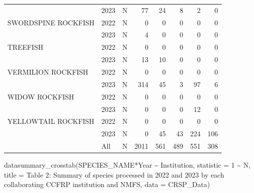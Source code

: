 \documentclass[
  letterpaper,
  DIV=11,
  numbers=noendperiod]{scrartcl}
\newenvironment{Shaded}{\begin{snugshade}}{\end{snugshade}}
\newcommand{\AttributeTok}[1]{\textcolor[rgb]{0.40,0.45,0.13}{#1}}
\newcommand{\DecValTok}[1]{\textcolor[rgb]{0.68,0.00,0.00}{#1}}
\newcommand{\FunctionTok}[1]{\textcolor[rgb]{0.28,0.35,0.67}{#1}}
\newcommand{\NormalTok}[1]{\textcolor[rgb]{0.00,0.23,0.31}{#1}}
\newcommand{\SpecialCharTok}[1]{\textcolor[rgb]{0.37,0.37,0.37}{#1}}
\newcommand{\StringTok}[1]{\textcolor[rgb]{0.13,0.47,0.30}{#1}}
\begin{document}
\begin{table}
\begin{tabular}[t]{lllrrrrr}
 & 2023 & N & 77 & 24 & 8 & 2 & 0\\
SWORDSPINE ROCKFISH & 2022 & N & 0 & 0 & 0 & 0 & 0\\
 & 2023 & N & 4 & 0 & 0 & 0 & 0\\
TREEFISH & 2022 & N & 0 & 0 & 0 & 0 & 0\\
 & 2023 & N & 13 & 10 & 0 & 0 & 0\\
VERMILION ROCKFISH & 2022 & N & 0 & 0 & 0 & 0 & 0\\
 & 2023 & N & 314 & 45 & 3 & 97 & 6\\
WIDOW ROCKFISH & 2022 & N & 0 & 0 & 0 & 0 & 0\\
 & 2023 & N & 0 & 0 & 0 & 12 & 0\\
YELLOWTAIL ROCKFISH & 2022 & N & 0 & 0 & 0 & 0 & 0\\
 & 2023 & N & 0 & 45 & 43 & 224 & 106\\
 & All & N & 2011 & 561 & 489 & 551 & 308\\
\bottomrule
\end{tabular}
\end{table}

\begin{Shaded}
\begin{Highlighting}[]
\FunctionTok{datasummary\_crosstab}\NormalTok{(SPECIES\_NAME}\SpecialCharTok{*}\NormalTok{Year }\SpecialCharTok{\textasciitilde{}}\NormalTok{ Institution, }\AttributeTok{statistic =} \DecValTok{1} \SpecialCharTok{\textasciitilde{}}\NormalTok{ N, }\AttributeTok{title =} \StringTok{\textquotesingle{}Table 2: Summary of species processed in 2022 and 2023 by each collaborating CCFRP institution and NMFS\textquotesingle{}}\NormalTok{, }\AttributeTok{data =}\NormalTok{ CRSP\_Data)}
\end{Highlighting}
\end{Shaded}
\end{document}
